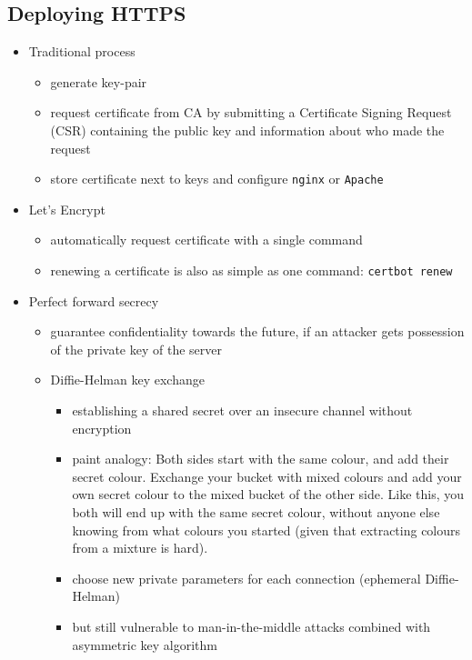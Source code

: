 \documentclass[12pt,titlepage,a4paper]{report}
\begin{document}
			\subsection{Deploying HTTPS}
			\begin{itemize}
				\item Traditional process
				\begin{itemize}
					\item generate key-pair
					\item request certificate from CA by submitting a Certificate Signing Request (CSR) containing the public key and information about who made the request
					\item store certificate next to keys and configure \texttt{nginx} or \texttt{Apache}
				\end{itemize}
				\item Let's Encrypt
				\begin{itemize}
					\item automatically request certificate with a single command
					\item renewing a certificate is also as simple as one command: \texttt{certbot renew}
				\end{itemize}
			
				\item Perfect forward secrecy
				\begin{itemize}
					\item guarantee confidentiality towards the future, if an attacker gets possession of the private key of the server
					\item Diffie-Helman key exchange
					\begin{itemize}
						\item establishing a shared secret over an insecure channel without encryption
						\item paint analogy: Both sides start with the same colour, and add their secret colour. Exchange your bucket with mixed colours and add your own secret colour to the mixed bucket of the other side. Like this, you both will end up with the same secret colour, without anyone else knowing from what colours you started (given that extracting colours from a mixture is hard).
						\item choose new private parameters for each connection (ephemeral Diffie-Helman)
						\item but still vulnerable to man-in-the-middle attacks
							\subitem combined with asymmetric key algorithm
					\end{itemize}
				\end{itemize}
			\end{itemize}
\end{document}
